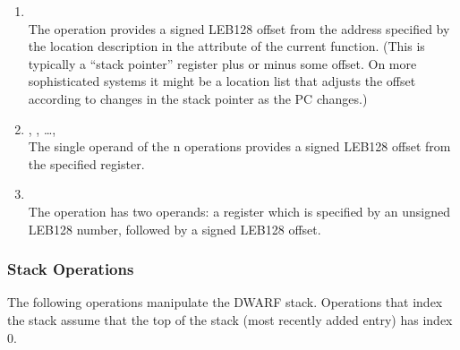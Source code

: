 \begin{enumerate}[1]

\item {} \\
The  operation provides a signed LEB128 offset
from the address specified by the location description in the
 attribute of the current function. (This
is typically a “stack pointer” register plus or minus
some offset. On more sophisticated systems it might be a
location list that adjusts the offset according to changes
in the stack pointer as the PC changes.)

\item {}, , \dots,  \\
The single operand of the n 
operations provides
a signed LEB128 offset from
the specified register.

\item {} \\
The  operation has two operands: a register
which is specified by an unsigned LEB128 number, followed by
a signed LEB128 offset.

\end{enumerate}


\subsubsection{Stack Operations}
\label{chap:stackoperations}
The following operations manipulate the DWARF stack. Operations
that index the stack assume that the top of the stack (most
recently added entry) has index 0.

